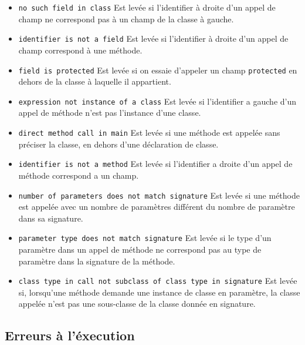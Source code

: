 \documentclass[a4paper]{article}
\begin{document}
\begin{itemize}
Est levée si l'identifier a gauche d'un appel de champ n'est pas l'instance d'une classe.
\item \texttt{no such field in class}
\newline
Est levée si l'identifier \`a droite d'un appel de champ ne correspond pas \`a un champ de la classe \`a gauche.
\item \texttt{identifier is not a field}
\newline
Est levée si l'identifier \`a droite d'un appel de champ correspond \`a une méthode.
\item \texttt{field is protected}
\newline
Est levée si on essaie d'appeler un champ \texttt{protected} en dehors de la classe \`a laquelle il appartient.
\item \texttt{expression not instance of a class}
\newline
Est levée si l'identifier a gauche d'un appel de méthode n'est pas l'instance d'une classe.
\item \texttt{direct method call in main}
\newline
Est levée si une méthode est appelée sans préciser la classe, en dehors d'une déclaration de classe.
\item \texttt{identifier is not a method}
\newline
Est levée si l'identifier a droite d'un appel de méthode correspond a un champ.
\item \texttt{number of parameters does not match signature}
\newline
Est levée si une méthode est appelée avec un nombre de paramètres différent du nombre de paramètre dans sa signature.
\item \texttt{parameter type does not match signature}
\newline
Est levée si le type d'un paramètre dans un appel de méthode ne correspond pas au type de paramètre dans la signature de la méthode.
\item \texttt{class type in call not subclass of class type in signature}
\newline
Est levée si, lorsqu'une méthode demande une instance de classe en paramètre, la classe appelée n'est pas une sous-classe de la classe donnée en signature. 
\end{itemize}


\subsection{Erreurs \`a l'\'execution}
\end{document}
